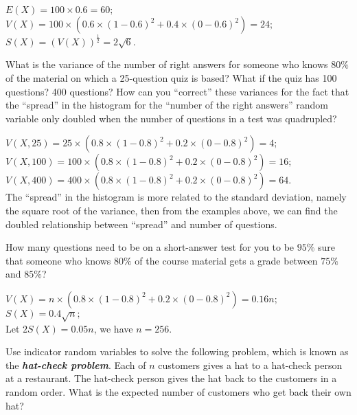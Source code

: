 \documentclass[12pt, a4paper, UTF8]{ctexart}
\begin{document}
\begin{solution}
  $E(X) = 100 \times 0.6 = 60;$\\
  $V(X) = 100 \times (0.6\times(1-0.6)^{2} + 0.4\times(0-0.6)^{2}) = 24;$\\
  $S(X) = (V(X))^{\frac{1}{2}} = 2\sqrt{6}.$
\end{solution}

\begin{problem}[CS: 5.7.6]
  What is the variance of the number of right answers for someone who knows $80\%$ 
  of the material on which a 25-question quiz is based? What if the quiz has 100 
  questions? 400 questions? How can you ``correct'' these variances for the fact 
  that the ``spread'' in the histogram for the ``number of the right answers'' 
  random variable only doubled when the number of questions in a test was quadrupled?
\end{problem}

\begin{solution}
  $V(X,25) = 25\times(0.8\times(1-0.8)^{2} + 0.2\times(0-0.8)^{2}) = 4;$\\
  $V(X,100) = 100\times(0.8\times(1-0.8)^{2} + 0.2\times(0-0.8)^{2}) = 16;$\\
  $V(X,400) = 400\times(0.8\times(1-0.8)^{2} + 0.2\times(0-0.8)^{2}) = 64.$\\
  The ``spread'' in the histogram is more related to the standard deviation, 
  namely the square root of the variance, then from the examples above, we can 
  find the doubled relationship between ``spread'' and number of questions.
\end{solution}

\begin{problem}[CS: 5.7.12]
  How many questions need to be on a short-answer test for you to be $95\%$ sure 
  that someone who knows $80\%$ of the course material gets a grade between $75\%$ 
  and $85\%$?
\end{problem}

\begin{solution}
  $V(X) = n\times(0.8\times(1-0.8)^{2} + 0.2\times(0-0.8)^{2}) = 0.16n;$\\
  $S(X) = 0.4\sqrt{n};$\\
  Let $2S(X) = 0.05n$, we have $n = 256.$
\end{solution}

\begin{problem}[TC: 5.2-4]
  Use indicator random variables to solve the following problem, which is known 
  as the \textsl{\textbf{hat-check problem}}. Each of $n$ customers gives a hat 
  to a hat-check person at a restaurant. The hat-check person gives the hat back 
  to the customers in a random order. What is the expected number of customers 
  who get back their own hat?
\end{problem}
\end{document}
